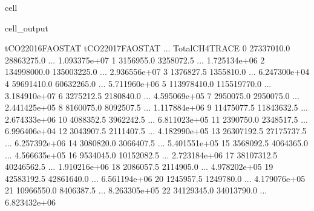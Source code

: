 \documentclass[letterpaper,10pt,english]{jupyterBook}
\begin{document}
\begin{sphinxuseclass}{cell}
\begin{sphinxVerbatimOutput}
\begin{sphinxuseclass}{cell_output}
\begin{sphinxVerbatim}[commandchars=\\\{\}]
    tCO2\PYGZus{}2016\PYGZus{}FAOSTAT  tCO2\PYGZus{}2017\PYGZus{}FAOSTAT  ...  Total\PYGZus{}CH4\PYGZus{}TRACE  \PYGZbs{}
0          27337010.0         28863275.0  ...     1.093375e+07   
1           3156955.0          3258072.5  ...     1.725134e+06   
2         134998000.0        135003225.0  ...     2.936556e+07   
3           1376827.5          1355810.0  ...     6.247300e+04   
4          59691410.0         60632265.0  ...     5.711960e+06   
5         113978410.0        115519770.0  ...     3.184910e+07   
6           3275212.5          2180840.0  ...     4.595069e+05   
7           2950075.0          2950075.0  ...     2.441425e+05   
8           8160075.0          8092507.5  ...     1.117884e+06   
9          11475077.5         11843632.5  ...     2.674333e+06   
10          4088352.5          3962242.5  ...     6.811023e+05   
11          2390750.0          2348517.5  ...     6.996406e+04   
12          3043907.5          2111407.5  ...     4.182990e+05   
13         26307192.5         27175737.5  ...     6.257392e+06   
14          3080820.0          3066407.5  ...     5.401551e+05   
15          3568092.5          4064365.0  ...     4.566635e+05   
16          9534045.0         10152082.5  ...     2.723184e+06   
17         38107312.5         40246562.5  ...     1.910216e+06   
18          2086057.5          2114905.0  ...     4.978202e+05   
19         42583192.5         42861640.0  ...     6.561194e+06   
20          1245957.5          1249780.0  ...     4.179076e+05   
21         10966550.0          8406387.5  ...     8.263305e+05   
22         34129345.0         34013790.0  ...     6.823432e+06   


\end{sphinxVerbatim}
\end{sphinxuseclass}
\end{sphinxVerbatimOutput}
\end{sphinxuseclass}
\end{document}
